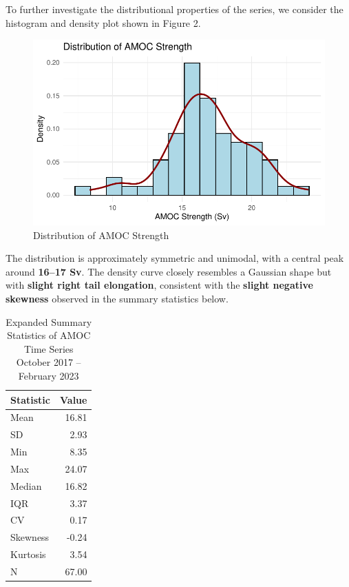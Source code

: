 \documentclass[
  11pt,
]{article}
\begin{document}
To further investigate the distributional properties of the series, we
consider the histogram and density plot shown in Figure 2.

\begin{figure}[H]

{\centering \includegraphics{project_files/figure-pdf/fig-AMOC Histo-1.pdf}

}

\caption{Distribution of AMOC Strength}

\end{figure}%

The distribution is approximately symmetric and unimodal, with a central
peak around \textbf{16--17 Sv}. The density curve closely resembles a
Gaussian shape but with \textbf{slight right tail elongation},
consistent with the \textbf{slight negative skewness} observed in the
summary statistics below.

\begin{table}
\caption*{
{\large Expanded Summary Statistics of AMOC Time Series} \\ 
{\small October 2017 – February 2023}
} 
\begin{tabular*}{\linewidth}{@{\extracolsep{\fill}}lr}
\toprule
Statistic & Value \\ 
\midrule\addlinespace[2.5pt]
Mean & 16.81 \\ 
SD & 2.93 \\ 
Min & 8.35 \\ 
Max & 24.07 \\ 
Median & 16.82 \\ 
IQR & 3.37 \\ 
CV & 0.17 \\ 
Skewness & -0.24 \\ 
Kurtosis & 3.54 \\ 
N & 67.00 \\ 
\bottomrule
\end{tabular*}
\end{table}
\end{document}
